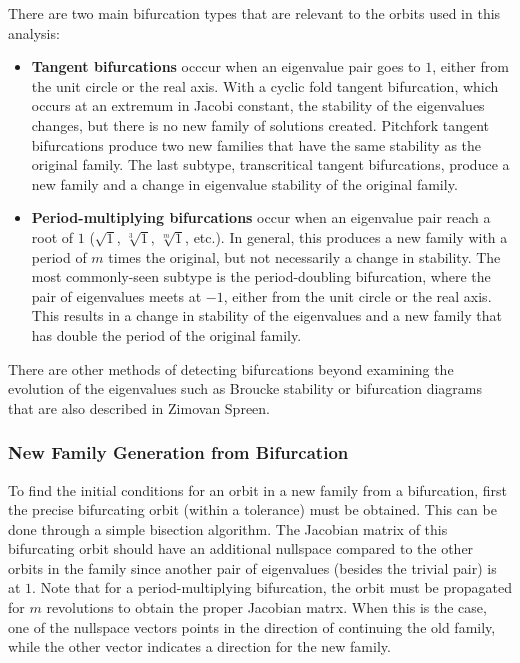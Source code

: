 There are two main bifurcation types that are relevant to the orbits used in this analysis:
\begin{itemize}
    \item \textbf{Tangent bifurcations} occcur when an eigenvalue pair goes to $1$, either from the
    unit circle or the real axis. With a cyclic fold tangent bifurcation, which occurs at an
    extremum in Jacobi constant, the stability of the eigenvalues changes, but there is no new
    family of solutions created. Pitchfork tangent bifurcations produce two new families that have
    the same stability as the original family. The last subtype, transcritical tangent
    bifurcations, produce a new family and a change in eigenvalue stability of the original family.
    \item \textbf{Period-multiplying bifurcations} occur when an eigenvalue pair reach a root of
    $1$ ($\sqrt{1}$, $\sqrt[3]{1}$, $\sqrt[m]{1}$, etc.). In general, this produces a new family
    with a period of $m$ times the original, but not necessarily a change in stability. The most
    commonly-seen subtype is the period-doubling bifurcation, where the pair of eigenvalues meets
    at $-1$, either from the unit circle or the real axis. This results in a change in stability of
    the eigenvalues and a new family that has double the period of the original family.
\end{itemize}
There are other methods of detecting bifurcations beyond examining the evolution of the eigenvalues
such as Broucke stability or bifurcation diagrams that are also described in Zimovan
Spreen\cite{ZimovanSpreen:2021}.

\subsubsection{New Family Generation from Bifurcation}
To find the initial conditions for an orbit in a new family from a bifurcation, first the precise
bifurcating orbit (within a tolerance) must be obtained. This can be done through a simple
bisection algorithm. The Jacobian matrix of this bifurcating orbit should have an additional
nullspace compared to the other orbits in the family since another pair of eigenvalues (besides the
trivial pair) is at $1$. Note that for a period-multiplying bifurcation, the orbit must be
propagated for $m$ revolutions to obtain the proper Jacobian matrx. When this is the case, one of
the nullspace vectors points in the direction of continuing the old family, while the other vector
indicates a direction for the new family.

